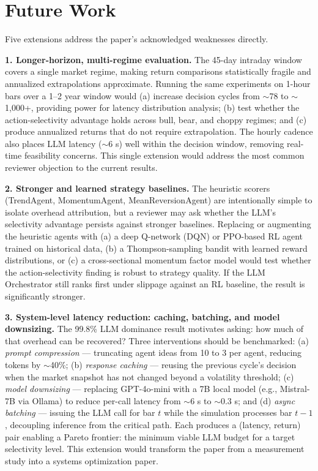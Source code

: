 \documentclass[10pt,conference]{IEEEtran}
\begin{document}
\section{Future Work}

Five extensions address the paper's acknowledged weaknesses directly.

\textbf{1. Longer-horizon, multi-regime evaluation.}
The 45-day intraday window covers a single market regime, making return comparisons statistically fragile and annualized extrapolations approximate. Running the same experiments on 1-hour bars over a 1--2 year window would (a) increase decision cycles from $\sim$78 to $\sim$1,000+, providing power for latency distribution analysis; (b) test whether the action-selectivity advantage holds across bull, bear, and choppy regimes; and (c) produce annualized returns that do not require extrapolation. The hourly cadence also places LLM latency ($\sim$6 s) well within the decision window, removing real-time feasibility concerns. This single extension would address the most common reviewer objection to the current results.

\textbf{2. Stronger and learned strategy baselines.}
The heuristic scorers (TrendAgent, MomentumAgent, MeanReversionAgent) are intentionally simple to isolate overhead attribution, but a reviewer may ask whether the LLM's selectivity advantage persists against stronger baselines. Replacing or augmenting the heuristic agents with (a) a deep Q-network (DQN) or PPO-based RL agent trained on historical data, (b) a Thompson-sampling bandit with learned reward distributions, or (c) a cross-sectional momentum factor model would test whether the action-selectivity finding is robust to strategy quality. If the LLM Orchestrator still ranks first under slippage against an RL baseline, the result is significantly stronger.

\textbf{3. System-level latency reduction: caching, batching, and model downsizing.}
The 99.8\% LLM dominance result motivates asking: how much of that overhead can be recovered? Three interventions should be benchmarked: (a) \textit{prompt compression} --- truncating agent ideas from 10 to 3 per agent, reducing tokens by $\sim$40\%; (b) \textit{response caching} --- reusing the previous cycle's decision when the market snapshot has not changed beyond a volatility threshold; (c) \textit{model downsizing} --- replacing GPT-4o-mini with a 7B local model (e.g., Mistral-7B via Ollama) to reduce per-call latency from $\sim$6 s to $\sim$0.3 s; and (d) \textit{async batching} --- issuing the LLM call for bar $t$ while the simulation processes bar $t-1$, decoupling inference from the critical path. Each produces a (latency, return) pair enabling a Pareto frontier: the minimum viable LLM budget for a target selectivity level. This extension would transform the paper from a measurement study into a systems optimization paper.
\end{document}
